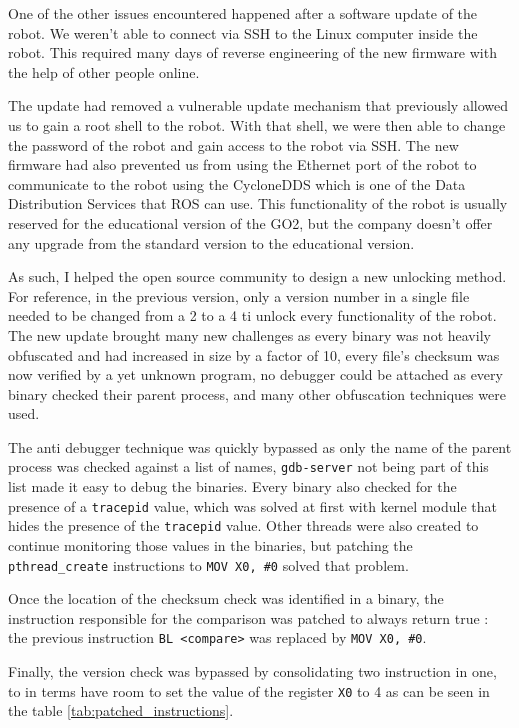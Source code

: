 \documentclass[11pt]{article}
\begin{document}
        One of the other issues encountered happened after a software update of the robot. We weren't able to connect via SSH to the Linux computer inside the robot. This required many days of reverse engineering of the new firmware with the help of other people online.

        The update had removed a vulnerable update mechanism that previously allowed us to gain a root shell to the robot. With that shell, we were then able to change the password of the robot and gain access to the robot via SSH. The new firmware had also prevented us from using the Ethernet port of the robot to communicate to the robot using the CycloneDDS which is one of the Data Distribution Services that ROS can use. This functionality of the robot is usually reserved for the educational version of the GO2, but the company doesn't offer any upgrade from the standard version to the educational version.

        As such, I helped the open source community to design a new unlocking method. For reference, in the previous version, only a version number in a single file needed to be changed from a 2 to a 4 ti unlock every functionality of the robot. The new update brought many new challenges as every binary was not heavily obfuscated and had increased in size by a factor of 10, every file's checksum was now verified by a yet unknown program, no debugger could be attached as every binary checked their parent process, and many other obfuscation techniques were used.

        The anti debugger technique was quickly bypassed as only the name of the parent process was checked against a list of names, \texttt{gdb-server} not being part of this list made it easy to debug the binaries. Every binary also checked for the presence of a \texttt{tracepid} value, which was solved at first with kernel module that hides the presence of the \texttt{tracepid} value. Other threads were also created to continue monitoring those values in the binaries, but patching the \texttt{pthread\_create} instructions to \texttt{MOV X0, \#0} solved that problem.

        Once the location of the checksum check was identified in a binary, the instruction responsible for the comparison was patched to always return true : the previous instruction \texttt{BL <compare>} was replaced by \texttt{MOV X0, \#0}.

        Finally, the version check was bypassed by consolidating two instruction in one, to in terms have room to set the value of the register \texttt{X0} to 4 as can be seen in the table \ref{tab:patched_instructions}.
        
\end{document}
